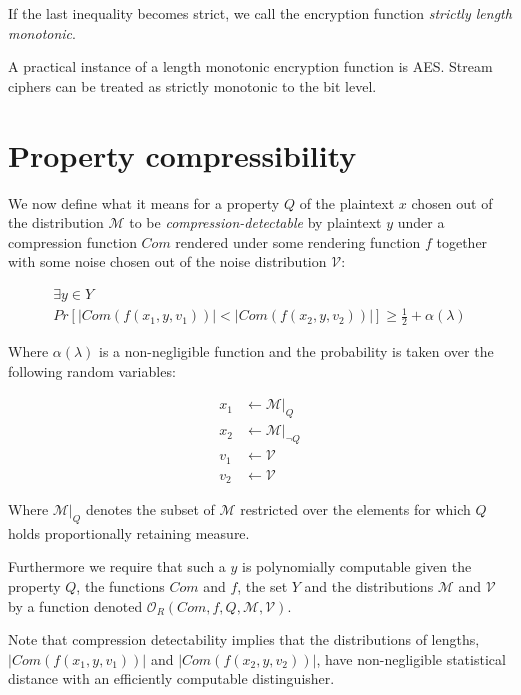 \documentclass{article}
\begin{document}
If the last inequality becomes strict, we call the encryption function
\textit{strictly length monotonic}.

A practical instance of a length monotonic encryption function is AES.
Stream ciphers can be treated as strictly monotonic to the bit level.

\section{Property compressibility}

We now define what it means for a property $Q$ of the plaintext $x$ chosen out of the distribution $\mathcal{M}$ to be \textit{compression-detectable} by plaintext $y$ under a compression function $Com$ rendered under some rendering function $f$ together with some noise chosen out of the noise distribution $\mathcal{V}$:

\begin{equation*}
    \begin{split}
        \exists y \in Y\\
        Pr[
            |Com(f(x_1, y, v_1))| < |Com(f(x_2, y, v_2))|
        ]
        \geq
        \frac{1}{2} + \alpha(\lambda)
    \end{split}
\end{equation*}

Where $\alpha(\lambda)$ is a non-negligible function and
the probability is taken over the following random variables:

\begin{align*}
    x_1 &\leftarrow \mathcal{M}|_Q\\
    x_2 &\leftarrow \mathcal{M}|_{\lnot Q}\\
    v_1 &\leftarrow \mathcal{V}\\
    v_2 &\leftarrow \mathcal{V}
\end{align*}

Where $\mathcal{M}|_Q$ denotes the subset of $\mathcal{M}$ restricted
over the elements for which $Q$ holds proportionally retaining measure.

Furthermore we require that such a $y$ is polynomially computable given
the property $Q$, the functions $Com$ and $f$, the set $Y$ and the distributions
$\mathcal{M}$ and $\mathcal{V}$ by a function denoted $\mathcal{O}_R(Com, f, Q, \mathcal{M}, \mathcal{V})$.

Note that compression detectability implies that the distributions of lengths,
$|Com(f(x_1, y, v_1))|$ and $|Com(f(x_2, y, v_2))|$, have non-negligible statistical
distance with an efficiently computable distinguisher.
\end{document}
